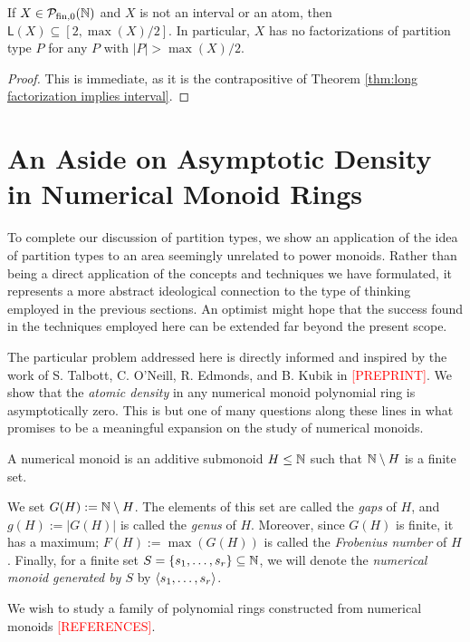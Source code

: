 \begin{cor}
If $X\in {\mathcal{P}_{\textrm{fin},0}(\mathbb{N})}$ and $X$ is not an interval or an atom, then $\mathsf{L}(X) \subseteq [2,\max(X)/2]$.
In particular, $X$ has no factorizations of partition type $P$ for any $P$ with $|P| > \max(X)/2$.
\end{cor}

\begin{proof}
This is immediate, as it is the contrapositive of Theorem \ref{thm:long factorization implies interval}.
\end{proof}


\section{An Aside on Asymptotic Density in Numerical Monoid Rings} \label{sec:numerical monoid ring density}
To complete our discussion of partition types, we show an application of the idea of partition types to an area seemingly unrelated to power monoids.  
Rather than being a direct application of the concepts and techniques we have formulated, it represents a more abstract ideological connection to the type of thinking employed in the previous sections.  
An optimist might hope that the success found in the techniques employed here can be extended far beyond the present scope.

The particular problem addressed here is directly informed and inspired by the work of S. Talbott, C. O'Neill, R. Edmonds, and B. Kubik in \textcolor{red}{[PREPRINT]}.
We show that the \textit{atomic density} in any numerical monoid polynomial ring is asymptotically zero.
This is but one of many questions along these lines in what promises to be a meaningful expansion on the study of numerical monoids.

\begin{defn}
	A numerical monoid is an additive submonoid $H \le \mathbb{N}$ such that $\mathbb{N}\setminus H$ is a finite set.  
	
	We set $G(H) := \mathbb{N} \setminus H$. 
	The elements of this set are called the \textit{gaps} of $H$, and $g(H) := |G(H)|$ is called the \textit{genus} of $H$.
	Moreover, since $G(H)$ is finite, it has a maximum; $F(H) := \max(G(H))$ is called the \textit{Frobenius number} of $H$.
	Finally, for a finite set $S = \{s_1,\dots, s_r\}\subseteq \mathbb{N}$, we will denote the \textit{numerical monoid generated by $S$} by $\langle s_1,\dots,s_r \rangle$.
\end{defn}


We wish to study a family of polynomial rings constructed from numerical monoids \textcolor{red}{[REFERENCES]}.

